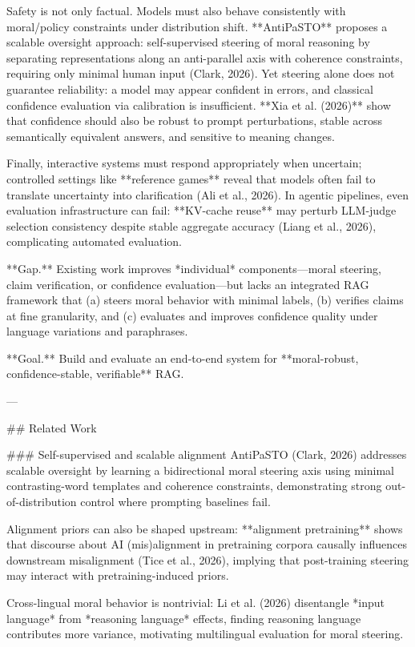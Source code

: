 Safety is not only factual. Models must also behave consistently with moral/policy constraints under distribution shift. **AntiPaSTO** proposes a scalable oversight approach: self-supervised steering of moral reasoning by separating representations along an anti-parallel axis with coherence constraints, requiring only minimal human input (Clark, 2026). Yet steering alone does not guarantee reliability: a model may appear confident in errors, and classical confidence evaluation via calibration is insufficient. **Xia et al. (2026)** show that confidence should also be robust to prompt perturbations, stable across semantically equivalent answers, and sensitive to meaning changes.

Finally, interactive systems must respond appropriately when uncertain; controlled settings like **reference games** reveal that models often fail to translate uncertainty into clarification (Ali et al., 2026). In agentic pipelines, even evaluation infrastructure can fail: **KV-cache reuse** may perturb LLM-judge selection consistency despite stable aggregate accuracy (Liang et al., 2026), complicating automated evaluation.

**Gap.** Existing work improves *individual* components—moral steering, claim verification, or confidence evaluation—but lacks an integrated RAG framework that (a) steers moral behavior with minimal labels, (b) verifies claims at fine granularity, and (c) evaluates and improves confidence quality under language variations and paraphrases.

**Goal.** Build and evaluate an end-to-end system for **moral-robust, confidence-stable, verifiable** RAG.

---

## Related Work  

### Self-supervised and scalable alignment  
AntiPaSTO (Clark, 2026) addresses scalable oversight by learning a bidirectional moral steering axis using minimal contrasting-word templates and coherence constraints, demonstrating strong out-of-distribution control where prompting baselines fail.

Alignment priors can also be shaped upstream: **alignment pretraining** shows that discourse about AI (mis)alignment in pretraining corpora causally influences downstream misalignment (Tice et al., 2026), implying that post-training steering may interact with pretraining-induced priors.

Cross-lingual moral behavior is nontrivial: Li et al. (2026) disentangle *input language* from *reasoning language* effects, finding reasoning language contributes more variance, motivating multilingual evaluation for moral steering.

